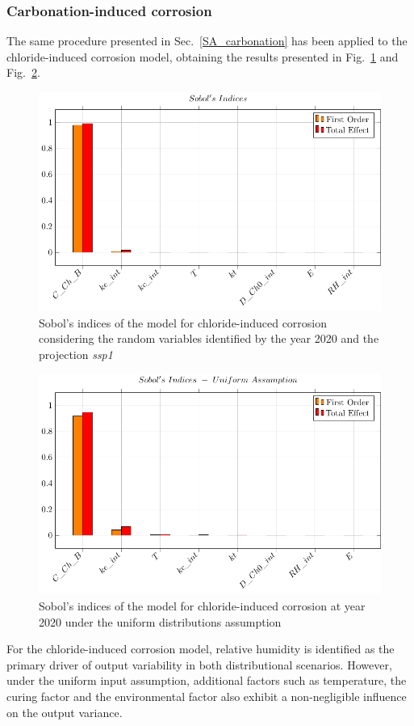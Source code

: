 \subsubsection{Carbonation-induced corrosion}
The same procedure presented in Sec.~\ref{SA_carbonation} has been applied to the chloride-induced corrosion model, obtaining the results presented in Fig.~\ref{Sobol_ch_2020ssp1} and Fig.~\ref{Sobol_ch_2020uniform}.
\begin{figure}[H]
    \centering
    \includegraphics[width=0.8\linewidth]{imgs/pdfs/sobols_indices/chloride/19_1_sobols_withRH_2020_ssp1.pdf}
    \caption{Sobol's indices of the model for chloride-induced corrosion considering the random variables identified by the year 2020 and the projection \textit{ssp1}}\label{Sobol_ch_2020ssp1}
\end{figure}

\begin{figure}[H]
    \centering
    \includegraphics[width=0.8\linewidth]{imgs/pdfs/sobols_indices/chloride/18_1_sobols_withRH_uniform_2020.pdf}
    \caption{Sobol's indices of the model for chloride-induced corrosion at year 2020 under the uniform distributions assumption}\label{Sobol_ch_2020uniform}
\end{figure}
For the chloride-induced corrosion model, relative humidity is identified as the primary driver of output variability in both distributional scenarios. However, under the uniform input assumption, additional factors such as temperature, the curing factor and the environmental factor also exhibit a non-negligible influence on the output variance.


